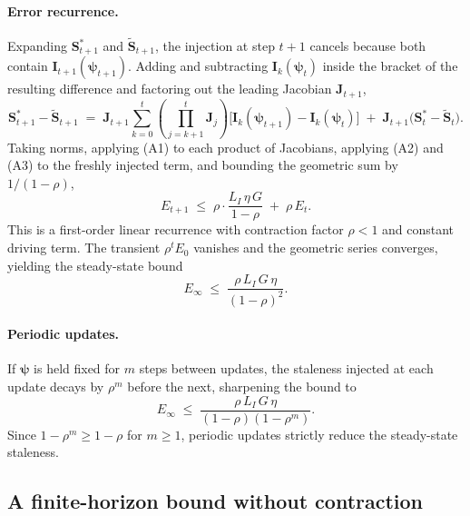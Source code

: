 \documentclass{article}
\begin{document}
\paragraph{Error recurrence.}
Expanding $\boldsymbol{S}_{t+1}^\ast$ and $\tilde{\boldsymbol{S}}_{t+1}$, the injection at step $t+1$
cancels because both contain $\boldsymbol{I}_{t+1}(\boldsymbol{\psi}_{t+1})$. Adding and
subtracting $\boldsymbol{I}_k(\boldsymbol{\psi}_t)$ inside the bracket of the resulting
difference and factoring out the leading Jacobian $\boldsymbol{J}_{t+1}$,
\begin{equation}
    \boldsymbol{S}_{t+1}^\ast - \tilde{\boldsymbol{S}}_{t+1}
    \;=\; \boldsymbol{J}_{t+1}\!\sum_{k=0}^{t} \left(\prod_{j=k+1}^{t} \boldsymbol{J}_j\right)\!
    \bigl[\boldsymbol{I}_k(\boldsymbol{\psi}_{t+1}) - \boldsymbol{I}_k(\boldsymbol{\psi}_t)\bigr]
    \;+\; \boldsymbol{J}_{t+1}\bigl(\boldsymbol{S}_t^\ast - \tilde{\boldsymbol{S}}_t\bigr).
\end{equation}
Taking norms, applying (A1) to each product of Jacobians, applying (A2)
and (A3) to the freshly injected term, and bounding the geometric sum by
$1/(1-\rho)$,
\begin{equation}
    E_{t+1} \;\le\; \rho \cdot \frac{L_I\, \eta\, G}{1 - \rho}
    \;+\; \rho\, E_t.
    \label{eq:err_recur}
\end{equation}
This is a first-order linear recurrence with contraction factor
$\rho < 1$ and constant driving term. The transient $\rho^t E_0$
vanishes and the geometric series converges, yielding the steady-state
bound
\begin{equation}
    E_\infty \;\le\; \frac{\rho\, L_I\, G\, \eta}{(1 - \rho)^2}.
    \label{eq:err_bound}
\end{equation}

\paragraph{Periodic updates.}
If $\boldsymbol{\psi}$ is held fixed for $m$ steps between updates, the staleness
injected at each update decays by $\rho^m$ before the next, sharpening
the bound to
\begin{equation}
    E_\infty \;\le\;
    \frac{\rho\, L_I\, G\, \eta}{(1 - \rho)(1 - \rho^m)}.
\end{equation}
Since $1 - \rho^m \ge 1 - \rho$ for $m \ge 1$, periodic updates strictly
reduce the steady-state staleness.

\subsection{A finite-horizon bound without contraction}
\label{sec:staleness-finite}
\end{document}
